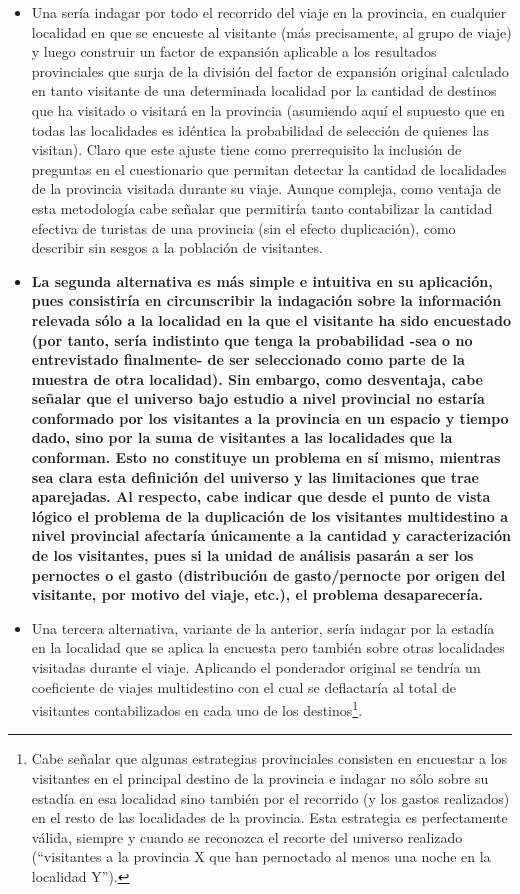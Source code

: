 \documentclass[
]{book}
\begin{document}
\begin{itemize}
\item
  Una sería indagar por todo el recorrido del viaje en la provincia, en cualquier localidad en que se encueste al visitante (más precisamente, al grupo de viaje) y luego construir un factor de expansión aplicable a los resultados provinciales que surja de la división del factor de expansión original calculado en tanto visitante de una determinada localidad por la cantidad de destinos que ha visitado o visitará en la provincia (asumiendo aquí el supuesto que en todas las localidades es idéntica la probabilidad de selección de quienes las visitan). Claro que este ajuste tiene como prerrequisito la inclusión de preguntas en el cuestionario que permitan detectar la cantidad de localidades de la provincia visitada durante su viaje. Aunque compleja, como ventaja de esta metodología cabe señalar que permitiría tanto contabilizar la cantidad efectiva de turistas de una provincia (sin el efecto duplicación), como describir sin sesgos a la población de visitantes.
\item
  \textbf{La segunda alternativa es más simple e intuitiva en su aplicación, pues consistiría en circunscribir la indagación sobre la información relevada sólo a la localidad en la que el visitante ha sido encuestado (por tanto, sería indistinto que tenga la probabilidad -sea o no entrevistado finalmente- de ser seleccionado como parte de la muestra de otra localidad). Sin embargo, como desventaja, cabe señalar que el universo bajo estudio a nivel provincial no estaría conformado por los visitantes a la provincia en un espacio y tiempo dado, sino por la suma de visitantes a las localidades que la conforman. Esto no constituye un problema en sí mismo, mientras sea clara esta definición del universo y las limitaciones que trae aparejadas. Al respecto, cabe indicar que desde el punto de vista lógico el problema de la duplicación de los visitantes multidestino a nivel provincial afectaría únicamente a la cantidad y caracterización de los visitantes, pues si la unidad de análisis pasarán a ser los pernoctes o el gasto (distribución de gasto/pernocte por origen del visitante, por motivo del viaje, etc.), el problema desaparecería.}
\item
  Una tercera alternativa, variante de la anterior, sería indagar por la estadía en la localidad que se aplica la encuesta pero también sobre otras localidades visitadas durante el viaje. Aplicando el ponderador original se tendría un coeficiente de viajes multidestino con el cual se deflactaría al total de visitantes contabilizados en cada uno de los destinos\footnote{Cabe señalar que algunas estrategias provinciales consisten en encuestar a los visitantes en el principal destino de la provincia e indagar no sólo sobre su estadía en esa localidad sino también por el recorrido (y los gastos realizados) en el resto de las localidades de la provincia. Esta estrategia es perfectamente válida, siempre y cuando se reconozca el recorte del universo realizado (``visitantes a la provincia X que han pernoctado al menos una noche en la localidad Y'').}.
\end{itemize}
\end{document}
